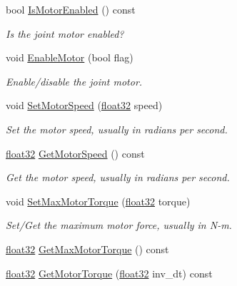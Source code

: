\begin{DoxyCompactItemize}
bool \mbox{\hyperlink{classb2_wheel_joint_aef7948a18ec2784397a1d3745824cd78}{Is\+Motor\+Enabled}} () const
\begin{DoxyCompactList}\small\item\em Is the joint motor enabled? \end{DoxyCompactList}\item 
void \mbox{\hyperlink{classb2_wheel_joint_a7a832d814bdda135a78fad41ba671da6}{Enable\+Motor}} (bool flag)
\begin{DoxyCompactList}\small\item\em Enable/disable the joint motor. \end{DoxyCompactList}\item 
void \mbox{\hyperlink{classb2_wheel_joint_a6e3255fcf5c82b979ad7e3dc1c089c0b}{Set\+Motor\+Speed}} (\mbox{\hyperlink{b2_settings_8h_aacdc525d6f7bddb3ae95d5c311bd06a1}{float32}} speed)
\begin{DoxyCompactList}\small\item\em Set the motor speed, usually in radians per second. \end{DoxyCompactList}\item 
\mbox{\hyperlink{b2_settings_8h_aacdc525d6f7bddb3ae95d5c311bd06a1}{float32}} \mbox{\hyperlink{classb2_wheel_joint_a47774ba5dfc1a6a5f15bcc651eea8127}{Get\+Motor\+Speed}} () const
\begin{DoxyCompactList}\small\item\em Get the motor speed, usually in radians per second. \end{DoxyCompactList}\item 
void \mbox{\hyperlink{classb2_wheel_joint_a8aae3cd624ec9d48fc86c325c4595edc}{Set\+Max\+Motor\+Torque}} (\mbox{\hyperlink{b2_settings_8h_aacdc525d6f7bddb3ae95d5c311bd06a1}{float32}} torque)
\begin{DoxyCompactList}\small\item\em Set/\+Get the maximum motor force, usually in N-\/m. \end{DoxyCompactList}\item 
\mbox{\hyperlink{b2_settings_8h_aacdc525d6f7bddb3ae95d5c311bd06a1}{float32}} \mbox{\hyperlink{classb2_wheel_joint_a8e7dc36e5c59760f2807886d0acd514e}{Get\+Max\+Motor\+Torque}} () const
\item 
\mbox{\hyperlink{b2_settings_8h_aacdc525d6f7bddb3ae95d5c311bd06a1}{float32}} \mbox{\hyperlink{classb2_wheel_joint_a635497eba904925e06fd5316ddec4539}{Get\+Motor\+Torque}} (\mbox{\hyperlink{b2_settings_8h_aacdc525d6f7bddb3ae95d5c311bd06a1}{float32}} inv\+\_\+dt) const

\end{DoxyCompactItemize}
